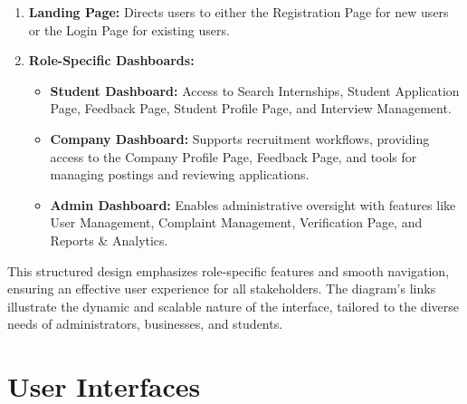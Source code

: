 \begin{enumerate}
    \item \textbf{Landing Page:} Directs users to either the Registration Page for new users or the Login Page for existing users.
    \item \textbf{Role-Specific Dashboards:}
    \begin{itemize}
        \item \textbf{Student Dashboard:} Access to Search Internships, Student Application Page, Feedback Page, Student Profile Page, and Interview Management.
        \item \textbf{Company Dashboard:} Supports recruitment workflows, providing access to the Company Profile Page, Feedback Page, and tools for managing postings and reviewing applications.
        \item \textbf{Admin Dashboard:} Enables administrative oversight with features like User Management, Complaint Management, Verification Page, and Reports \& Analytics.
    \end{itemize}
\end{enumerate}

This structured design emphasizes role-specific features and smooth navigation, ensuring an effective user experience for all stakeholders. The diagram's links illustrate the dynamic and scalable nature of the interface, tailored to the diverse needs of administrators, businesses, and students.

\section{User Interfaces}
\label{sec:user_interfaces}%

